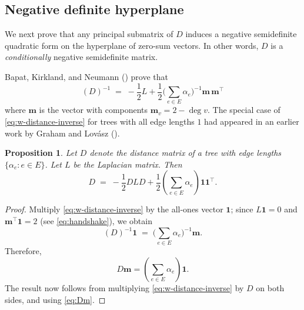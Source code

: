 \documentclass[12pt]{amsart}
\newtheorem{prop}[thm]{Proposition}
\theoremstyle{definition}
\newcommand{\bone}{\mathbf{1}}
\newcommand{\boldm}{\mathbf{m}}
\newcommand{\Da}{{D}}
\newcommand{\La}{L}
\newcommand{\tr}{\intercal}
\begin{document}
\subsection{Negative definite hyperplane}

We next prove that any principal submatrix of $D$ induces a negative semidefinite quadratic form on the hyperplane of zero-sum vectors. In other words, $D$ is a {\em conditionally} negative semidefinite matrix.

Bapat, Kirkland, and Neumann (\cite[Theorem 2.1]{bapat-kirkland-neumann}) prove that
\begin{equation}\label{eq:w-distance-inverse}
	(\Da)^{-1} \;=\; - \frac12 \La + \frac12 \Big( \sum_{e \in E} \alpha_e\Big)^{-1} \boldm\, \boldm^\tr
\end{equation}
where $\boldm$ is the vector with components $\boldm_v = 2 - \deg v$.
The special case of \eqref{eq:w-distance-inverse} for trees with all edge lengths $1$ had appeared in an earlier work by Graham and Lov\'asz (\cite[Lemma 1]{graham-lovasz}).

\begin{prop}
\label{prop:dist-laplacian}
Let $D$ denote the distance matrix of a tree with edge lengths $\{\alpha_e \colon e \in E\}$. Let $\La$ be the Laplacian matrix. 
Then
\[
	\Da \;=\; - \frac{1}{2} \Da \La \Da + \frac{1}{2} \left( \sum_{e \in E} \alpha_e\right) \bone \bone^\tr .
\]
\end{prop}
\begin{proof}
Multiply \eqref{eq:w-distance-inverse} by the all-ones vector $\bone$; since $\La \bone = 0$ and $\boldm^\tr \bone = 2$ (see \eqref{eq:handshake}), we obtain 
\[
	(\Da)^{-1} \bone \;=\; \Big( \sum_{e \in E} \alpha_e\Big)^{-1} \boldm .
\]
Therefore, 
\begin{equation}\label{eq:Dm}
\Da \boldm = \left( \sum_{e \in E} \alpha_e \right) \bone .
\end{equation}
The result now follows from multiplying \eqref{eq:w-distance-inverse} by $\Da$ on both sides, and using \eqref{eq:Dm}. 
\end{proof}
\end{document}
